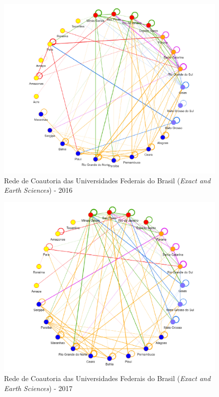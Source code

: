 \begin{figure}[H]
	\centering
	\includegraphics[scale=0.6]{Imagens/rede-exact-br-2016.pdf}
	\caption{Rede de Coautoria das Universidades Federais do Brasil (\textit{Exact and Earth Sciences}) - 2016}
	\label{Rede de Coautoria - UF EXACT BR 2016}
\end{figure}

\begin{figure}[H]
	\centering
	\includegraphics[scale=0.6]{Imagens/rede-exact-br-2017.pdf}
	\caption{Rede de Coautoria das Universidades Federais do Brasil (\textit{Exact and Earth Sciences}) - 2017}
	\label{Rede de Coautoria - UF EXACT BR 2017}
\end{figure}



